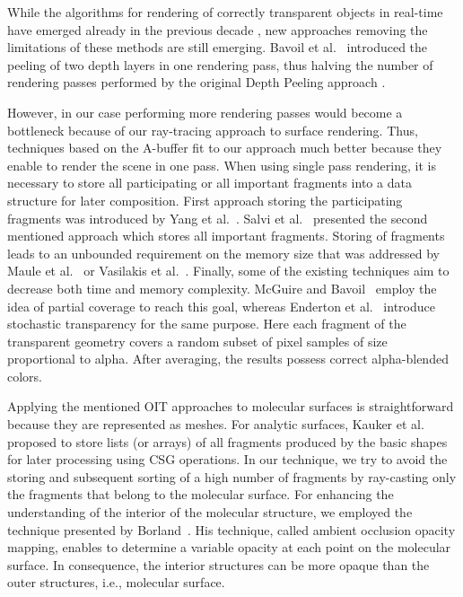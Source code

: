 While the algorithms for rendering of correctly transparent objects in real-time have emerged already in the previous decade \cite{everitt2001interactive}, new approaches removing the limitations of these methods are still emerging.
Bavoil et al.~\cite{bavoil2008order} introduced the peeling of two depth layers in one rendering pass, thus halving the number of rendering passes performed by the original Depth Peeling approach \cite{everitt2001interactive}.

However, in our case performing more rendering passes would become a bottleneck because of our ray-tracing approach to surface rendering.
Thus, techniques based on the A-buffer fit to our approach much better because they enable to render the scene in one pass.
When using single pass rendering, it is necessary to store all participating or all important fragments into a data structure for later composition.
First approach storing the participating fragments was introduced by Yang et al.~\cite{yang2010real}. Salvi et al.~\cite{salvi2011adaptive} presented the second mentioned approach which stores all important fragments.
Storing of fragments leads to an unbounded requirement on the memory size that was addressed by Maule et al.~\cite{maule2012memory} or Vasilakis et al.~\cite{vasilakis2015k+buffer}.
Finally, some of the existing techniques aim to decrease both time and memory complexity.
McGuire and Bavoil~\cite{mcguire2013weighted} employ the idea of partial coverage to reach this goal, whereas Enderton et al.~\cite{enderton2011stochastic} introduce stochastic transparency for the same purpose. 
Here each fragment of the transparent geometry covers a random subset of pixel samples of size proportional to alpha. 
After averaging, the results possess correct alpha-blended colors. 

Applying the mentioned OIT approaches to molecular surfaces is straightforward because they are represented as meshes.
For analytic surfaces, Kauker et al.~\cite{kauker2013rendering} proposed to store lists (or arrays) of all fragments produced by the basic shapes for later processing using CSG operations.
In our technique, we try to avoid the storing and subsequent sorting of a high number of fragments by ray-casting only the fragments that belong to the molecular surface.
For enhancing the understanding of the interior of the molecular structure, we employed the technique presented by Borland~\cite{borland2011ambient}. 
His technique, called ambient occlusion opacity mapping, enables to determine a variable opacity at each point on the molecular surface.
In consequence, the interior structures can be more opaque than the outer structures, i.e., molecular surface.

